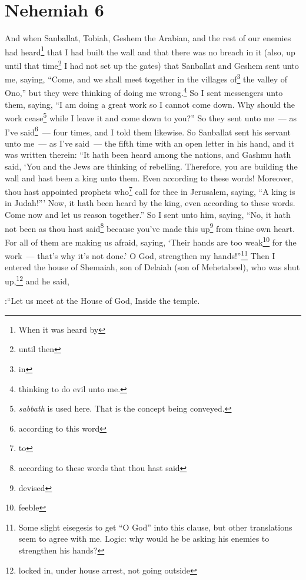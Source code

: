\section{Nehemiah 6}\label{Nehemiah 6}
\begin{enumerate}[align=center]
     And when Sanballat, Tobiah, Geshem the Arabian, and the rest of our enemies had heard\footnote{When it was heard by} that I had built the wall and that there was no breach in it (also, up until that time\footnote{until then} I had not set up the gates)%
     that Sanballat and Geshem sent unto me, saying, ``Come, and we shall meet together in the villages of\footnote{in} the valley of Ono,'' but they were thinking of doing me wrong.\footnote{thinking to do evil unto me.}%
     So I sent messengers unto them, saying, ``I am doing a great work so I cannot come down. Why should the work cease\footnote{\textit{sabbath} is used here. That is the concept being conveyed.} while I leave it and come down to you?''%
     So they sent unto me~--- as I've said\footnote{according to this word}~--- four times, and I told them likewise.%
     So Sanballat sent his servant unto me~--- as I've said~--- the fifth time with an open letter in his hand,%
     and it was written therein: ``It hath been heard among the nations, and Gashmu hath said, `You and the Jews are thinking of rebelling. Therefore, you are building the wall and hast been a king unto them. Even according to these words!%
     Moreover, thou hast appointed prophets who\footnote{to} call for thee in Jerusalem, saying, ``A king is in Judah!''' Now, it hath been heard by the king, even according to these words. Come now and let us reason together.''%
     So I sent unto him, saying, ``No, it hath not been as thou hast said\footnote{according to these words that thou hast said} because you've made this up\footnote{devised} from thine own heart.%
     For all of them are making us afraid, saying, `Their hands are too weak\footnote{feeble} for the work~--- that's why it's not done.' O God, strengthen my hands!''\footnote{Some slight eisegesis to get ``O God'' into this clause, but other translations seem to agree with me. Logic: why would he be asking his enemies to strengthen his hands?}%
     Then I entered the house of Shemaiah, son of Delaiah (son of Mehetabeel), who was shut up,\footnote{locked in, under house arrest, not going outside} and he said,

:``Let us meet at the House of God, Inside the temple.


\end{enumerate}
